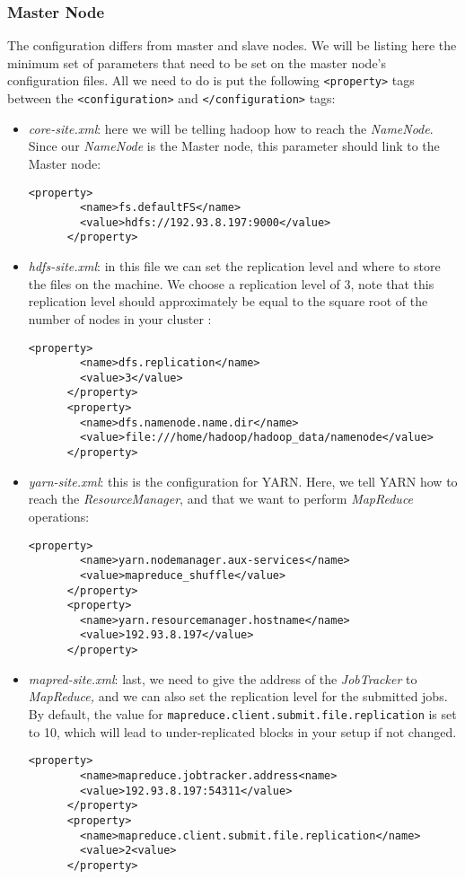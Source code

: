 \documentclass[a4paper, 12pt]{article}
\begin{document}
    \subsubsection{Master Node}

The configuration differs from master and slave nodes. We will be listing here the minimum set of parameters that need to be set on the master node's configuration files. All we need to do is put the following \texttt{<property>} tags between the \texttt{<configuration>} and \texttt{</configuration>} tags:

\begin{itemize}
  \item \textit{core-site.xml}: here we will be telling hadoop how to reach the \textit{NameNode}. Since our \textit{NameNode} is the Master node, this parameter should link to the Master node:
    \begin{lstlisting}[style=xml]
      <property>
        <name>fs.defaultFS</name>
        <value>hdfs://192.93.8.197:9000</value>
      </property>
    \end{lstlisting}
  \item \textit{hdfs-site.xml}: in this file we can set the replication level and where to store the files on the machine. We choose a replication level of 3, note that this replication level should approximately be equal to the square root of the number of nodes in your cluster \cite{hadoop_mapred_default}:
    \begin{lstlisting}[style=xml]
      <property>
        <name>dfs.replication</name>
        <value>3</value>
      </property>
      <property>
        <name>dfs.namenode.name.dir</name>
        <value>file:///home/hadoop/hadoop_data/namenode</value>
      </property>
    \end{lstlisting}
  \item \textit{yarn-site.xml}: this is the configuration for YARN. Here, we tell YARN how to reach the \textit{ResourceManager}, and that we want to perform \textit{MapReduce} operations:
    \begin{lstlisting}[style=xml]
      <property>
        <name>yarn.nodemanager.aux-services</name>
        <value>mapreduce_shuffle</value>
      </property>
      <property>
        <name>yarn.resourcemanager.hostname</name>
        <value>192.93.8.197</value>
      </property>
    \end{lstlisting}
  \item \textit{mapred-site.xml}: last, we need to give the address of the \textit{JobTracker} to \textit{MapReduce,} and we can also set the replication level for the submitted jobs. By default, the value for \texttt{mapreduce.client.submit.file.replication} is set to 10, which will lead to under-replicated blocks in your setup if not changed.
    \begin{lstlisting}[style=xml]
      <property>
        <name>mapreduce.jobtracker.address<name>
        <value>192.93.8.197:54311</value>
      </property>
      <property>
        <name>mapreduce.client.submit.file.replication</name>
        <value>2<value>
      </property>
    \end{lstlisting}
\end{itemize}
\end{document}
